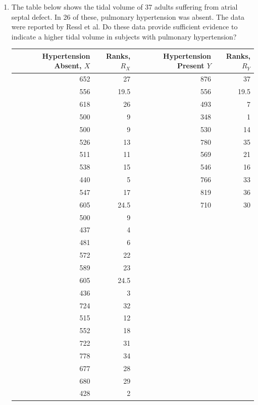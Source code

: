 \documentclass{article}
\begin{document}
\begin{enumerate}
    \item The table below shows the tidal volume of 37 adults suffering from atrial septal defect. In 26 of these, pulmonary hypertension was absent. The data were reported by Ressl et al. Do these data provide sufficient evidence to indicate a higher tidal volume in subjects with pulmonary hypertension?
    \begin{table}[H]
    \begin{tabular}{rrrr}
    Hypertension Absent, $X$ & Ranks, $R_X$ & Hypertension Present $Y$ & Ranks, $R_Y$ \\
    \hline
    652 & 27 & 876 & 37 \\
    556 & 19.5 & 556 & 19.5 \\
    618 & 26 & 493 & 7 \\
    500 & 9 & 348 & 1 \\
    500 & 9 & 530 & 14 \\
    526 & 13 & 780 & 35 \\
    511 & 11 & 569 & 21 \\
    538 & 15 & 546 & 16 \\
    440 & 5 & 766 & 33 \\
    547 & 17 & 819 & 36 \\
    605 & 24.5 & 710 & 30 \\
    500 & 9 & &  \\
    437 & 4 & &    \\
    481 & 6 &   \\
    572 & 22 &   \\
    589 & 23 &  \\
    605 & 24.5 &   \\
    436 & 3 &  & \\
    724 & 32 &  & \\
    515 & 12 &  & \\
    552 & 18 &  & \\
    722 & 31 &  & \\
    778 & 34 &  & \\
    677 & 28 &  & \\
    680 & 29 & &  \\
    428 & 2 &  &
    \end{tabular}
    \end{table}
\end{enumerate}
\end{document}
